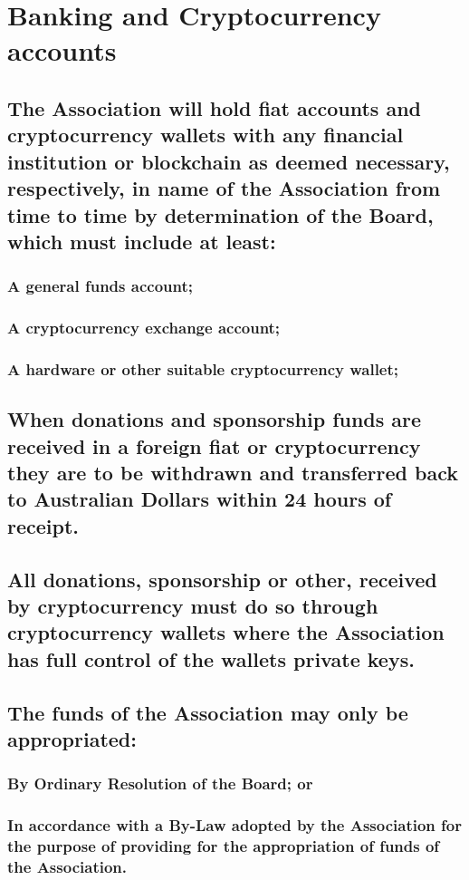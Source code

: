 \documentclass{article}
\newenvironment{subs}
  {\adjustwidth{2em}{0pt}}
  {\endadjustwidth}
\begin{document}
\section{Banking and Cryptocurrency accounts}
\begin{subs}
\subsection{The Association will hold fiat accounts and cryptocurrency wallets with any financial institution or blockchain as deemed necessary, respectively, in name of the Association from time to time by determination of the Board, which must include at least:}
\begin{subs}
\subsubsection{A general funds account;}
\subsubsection{A cryptocurrency exchange account;}
\newpage

\subsubsection{A hardware or other suitable cryptocurrency wallet;}
\end{subs}
\subsection{When donations and sponsorship funds are received in a foreign fiat or cryptocurrency they are to be withdrawn and transferred back to Australian Dollars within 24 hours of receipt.}
\subsection{All donations, sponsorship or other, received by cryptocurrency must do so through cryptocurrency wallets where the Association has full control of the wallets private keys.}
\end{subs}

\begin{subs}
\subsection{The funds of the Association may only be appropriated:}
\begin{subs}
\subsubsection{By Ordinary Resolution of the Board; or}
\subsubsection{In accordance with a By-Law adopted by the Association for the purpose of providing for the appropriation of funds of the Association.}
\end{subs}
\end{subs}
\end{document}
